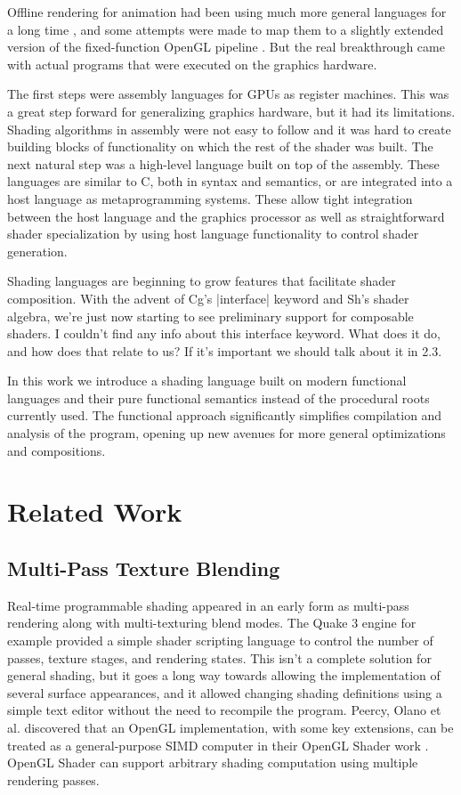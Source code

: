 \documentclass[review]{acmsiggraph}      %
\begin{document}
Offline rendering for animation had been using much more general languages
for a long time \cite{HanrahanRenderman}, and some attempts were made to map 
them to a slightly extended version of the fixed-function OpenGL pipeline 
\cite{peercy00interactive}. But the real breakthrough came with actual
programs that were executed on the graphics hardware. 

The first steps were assembly languages for GPUs as register machines.
This was a great step forward for generalizing graphics hardware, but
it had its limitations.  Shading algorithms in assembly were not easy
to follow and it was hard to create building blocks of functionality
on which the rest of the shader was built.  The next natural step was
a high-level language built on top of the assembly.  These languages
are similar to C, both in syntax and semantics, or are integrated into
a host language as metaprogramming systems.  These allow tight
integration between the host language and the graphics processor as
well as straightforward shader specialization by using host language
functionality to control shader generation.

Shading languages are beginning to grow features that facilitate
shader composition.  With the advent of Cg's |interface| keyword and
Sh's shader algebra, we're just now starting to see preliminary
support for composable shaders. I couldn't find any info about this
interface keyword. What does it do, and how does that relate to us? If it's
important we should talk about it in 2.3.

In this work we introduce a shading language built on modern
functional languages and their pure functional semantics instead of the
procedural roots currently used. The functional approach significantly
simplifies compilation and analysis of the program, opening up new
avenues for more general optimizations and compositions.

\section{Related Work}

\subsection{Multi-Pass Texture Blending }

Real-time programmable shading appeared in an early form as multi-pass
rendering along with multi-texturing blend modes.  The Quake 3 engine
for example provided a simple shader scripting language to control the
number of passes, texture stages, and rendering states.  This isn't a
complete solution for general shading, but it goes a long way towards
allowing the implementation of several surface appearances, and it allowed
changing shading definitions using a simple text editor without the need to
recompile the program.  Peercy,
Olano et al. discovered that an OpenGL implementation, with some key
extensions, can be treated as a general-purpose SIMD computer in their
OpenGL Shader work \cite{peercy00interactive}.  OpenGL Shader can
support arbitrary shading computation using multiple rendering
passes.
\end{document}
